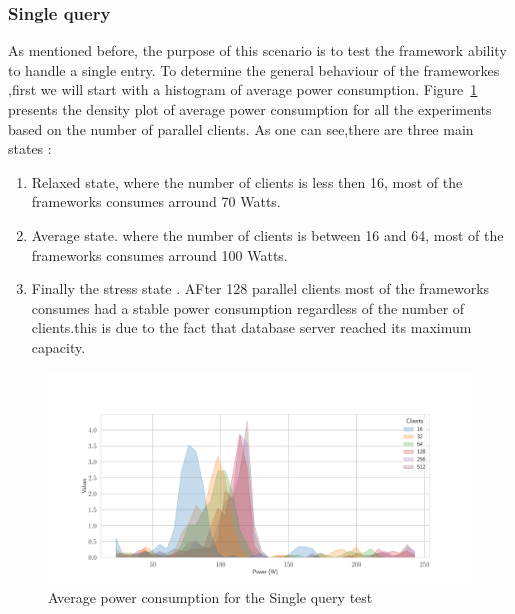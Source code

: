 \subsubsection{Single query}
As mentioned before, the purpose of this scenario is to test the framework ability to handle a single entry.
To determine the general behaviour of the frameworkes ,first we will start with a histogram of average power consumption. Figure~\ref{fig:av_power_db} presents the  density plot of average power consumption  for all the experiments based on the number of parallel clients. As one can see,there are three main states :
\begin{enumerate}
    \item Relaxed state, where the number of clients is less then 16, most of the frameworks consumes arround 70 Watts.
    \item Average state. where the number of clients is between 16 and 64, most of the frameworks consumes arround 100 Watts.
    \item Finally the stress state . AFter 128 parallel clients most of the frameworks consumes had a stable power consumption regardless of the number of clients.this is due to the fact that database server reached its maximum capacity. %
\end{enumerate}
\begin{figure}[hbt]
    \centering
    \includegraphics[width=
        \columnwidth]{imgs/histogram_av_power_cpu_db}
    \caption{Average power consumption for the Single query test }
    \label{fig:av_power_db}
\end{figure}

